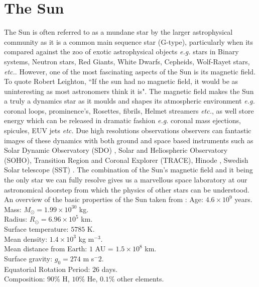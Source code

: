 \documentclass[12pt]{ociamthesis}
\newcommand{\np}{\\ \\}
\begin{document}
\section{The Sun}
\label{sec:Sun}
The Sun is often referred to as a mundane star by the larger astrophysical community as it is a common main sequence star (G-type), particularly when its compared against the zoo of exotic astrophysical objects \textit{e.g.} stars in Binary systems, Neutron stars, Red Giants, White Dwarfs, Cepheids, Wolf-Rayet stars, \textit{etc.}. However, one of the most fascinating aspects of the Sun is its magnetic field. To quote Robert Leighton, ``If the sun had no magnetic field, it would be as uninteresting as most astronomers think it is". The magnetic field makes the Sun a truly a dynamics star as it moulds and shapes its atmospheric environment \textit{e.g.} coronal loops, prominence's, Rosettes, fibrils, Helmet streamers \textit{etc.}, as well store energy which can be released in dramatic fashion \textit{e.g.} coronal mass ejections, spicules, EUV jets \textit{etc.} Due high resolutions observations observers can fantastic images of these dynamics with both ground and space based instruments such as Solar Dynamic Observatory (SDO) \citep{Lemen2012SoPh27517L}, Solar and Heliospheric Observatory (SOHO), Transition Region and Coronal Explorer (TRACE), Hinode \citep{Tsuneta2008SoPh,Suematsu2008SoPh,Ichimoto2008SoPh}, Swedish Solar telescope (SST) \citep{Scharmer2003SPIE}. The combination of the Sun's magnetic field and it being the only star we can fully resolve gives us a marvellous space laboratory at our astronomical doorstep from which the physics of other stars can be understood. An overview of the basic properties of the Sun taken from \cite{priest2014magnetohydrodynamics}:
Age: $4.6 \times 10^9$ years. \\
Mass: $M_{\odot}= 1.99 \times 10^{30}$ kg. \\
Radius: $R_{\odot} = 6.96 \times 10^5$ km. \\
Surface temperature: $5785$ K. \\
Mean density: $1.4 \times 10^3$ kg m$^{-3}$. \\
Mean distance from Earth: $1$ AU = $1.5 \times 10^8$ km. \\
Surface gravity: $g_{0}=274$ m s$^-2$. \\
Equatorial Rotation Period: $26$ days. \\
Composition: $90 \%$ H, $10 \%$ He, $0.1 \%$ other elements.\np
%
\end{document}
